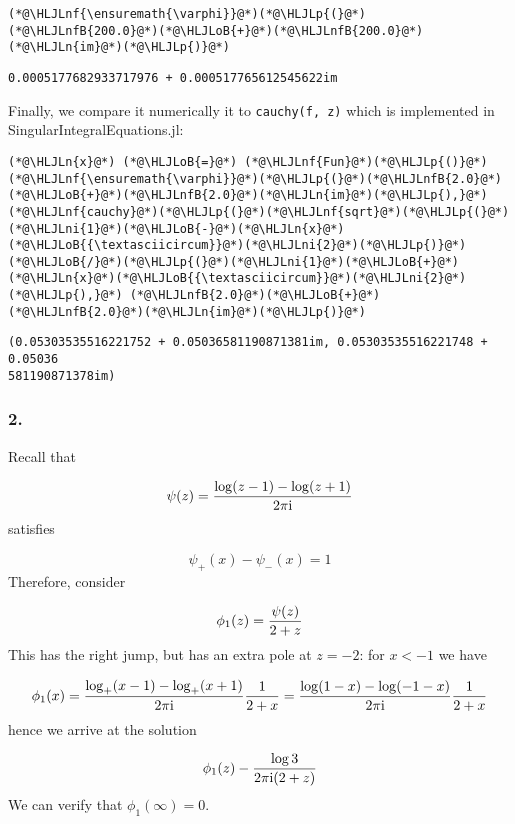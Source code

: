 \documentclass[12pt,a4paper]{article}
\newcommand{\HLJLn}[1]{#1}
\newcommand{\HLJLnf}[1]{\textcolor[RGB]{66,102,213}{#1}}
\newcommand{\HLJLnfB}[1]{\textcolor[RGB]{59,151,46}{#1}}
\newcommand{\HLJLni}[1]{\textcolor[RGB]{59,151,46}{#1}}
\newcommand{\HLJLoB}[1]{\textcolor[RGB]{102,102,102}{\textbf{#1}}}
\newcommand{\HLJLp}[1]{#1}
\def\I{ {\rm i} }
\begin{document}
\begin{lstlisting}
(*@\HLJLnf{\ensuremath{\varphi}}@*)(*@\HLJLp{(}@*)(*@\HLJLnfB{200.0}@*)(*@\HLJLoB{+}@*)(*@\HLJLnfB{200.0}@*)(*@\HLJLn{im}@*)(*@\HLJLp{)}@*)
\end{lstlisting}

\begin{lstlisting}
0.0005177682933717976 + 0.000517765612545622im
\end{lstlisting}


Finally, we compare it numerically it to \texttt{cauchy(f, z)} which is implemented in SingularIntegralEquations.jl:


\begin{lstlisting}
(*@\HLJLn{x}@*) (*@\HLJLoB{=}@*) (*@\HLJLnf{Fun}@*)(*@\HLJLp{()}@*)
(*@\HLJLnf{\ensuremath{\varphi}}@*)(*@\HLJLp{(}@*)(*@\HLJLnfB{2.0}@*)(*@\HLJLoB{+}@*)(*@\HLJLnfB{2.0}@*)(*@\HLJLn{im}@*)(*@\HLJLp{),}@*)(*@\HLJLnf{cauchy}@*)(*@\HLJLp{(}@*)(*@\HLJLnf{sqrt}@*)(*@\HLJLp{(}@*)(*@\HLJLni{1}@*)(*@\HLJLoB{-}@*)(*@\HLJLn{x}@*)(*@\HLJLoB{{\textasciicircum}}@*)(*@\HLJLni{2}@*)(*@\HLJLp{)}@*)(*@\HLJLoB{/}@*)(*@\HLJLp{(}@*)(*@\HLJLni{1}@*)(*@\HLJLoB{+}@*)(*@\HLJLn{x}@*)(*@\HLJLoB{{\textasciicircum}}@*)(*@\HLJLni{2}@*)(*@\HLJLp{),}@*) (*@\HLJLnfB{2.0}@*)(*@\HLJLoB{+}@*)(*@\HLJLnfB{2.0}@*)(*@\HLJLn{im}@*)(*@\HLJLp{)}@*)
\end{lstlisting}

\begin{lstlisting}
(0.05303535516221752 + 0.05036581190871381im, 0.05303535516221748 + 0.05036
581190871378im)
\end{lstlisting}


\subsubsection{2.}
Recall that

\[
\psi(z) = {\log(z-1) - \log(z+1)  \over 2 \pi \I}
\]
satisfies

\[
\psi_+(x) - \psi_-(x) = 1
\]
Therefore, consider

\[
\phi_1(z) = {\psi(z) \over 2 + z}
\]
This has the right jump, but has an extra pole at $z = -2$: for $x < -1$ we have

\[
\phi_1(x) = {\log_+(x-1) - \log_+(x+1)  \over 2 \pi \I} {1 \over 2 + x} =
   {\log(1-x) - \log(-1-x)  \over 2 \pi \I} {1 \over 2 + x}
\]
hence we arrive at the solution

\[
\phi_1(z) - {\log 3 \over 2 \pi \I (2+z)}
\]
We can verify that $\phi_1(\infty) = 0$.
\end{document}
